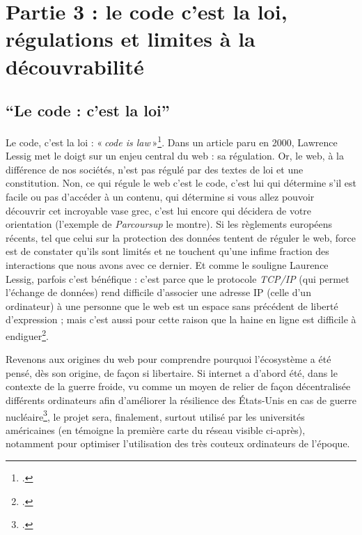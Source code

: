 

\part{Partie 3 : le code c'est la loi, régulations et limites à la découvrabilité}

\chapter*{\enquote{Le code : c'est la loi}}

Le code, c’est la loi : « \textit{code is law} »\footcite[(nous avons consulté la version française disponible sur Framablog)]{lessig_code_2000}. Dans un article paru en 2000, Lawrence Lessig met le doigt sur un enjeu central du web : sa régulation. Or, le web, à la différence de nos sociétés, n’est pas régulé par des textes de loi et une constitution. Non, ce qui régule le web c’est le code, c’est lui qui détermine s’il est facile ou pas d’accéder à un contenu, qui détermine si vous allez pouvoir découvrir cet incroyable vase grec, c’est lui encore qui décidera de votre orientation (l’exemple de \textit{Parcoursup} le montre). Si les règlements européens récents, tel que celui sur la protection des données tentent de réguler le web, force est de constater qu’ils sont limités et ne touchent qu’une infime fraction des interactions que nous avons avec ce dernier. Et comme le souligne Laurence Lessig, parfois c’est bénéfique : c’est parce que le protocole \textit{TCP/IP} (qui permet l’échange de données) rend difficile d’associer une adresse IP (celle d’un ordinateur) à une personne que le web est un espace sans précédent de liberté d’expression ; mais c’est aussi pour cette raison que la haine en ligne est difficile à endiguer\footcite[§8 et § 9]{lessig_code_2000}.

Revenons aux origines du web pour comprendre pourquoi l’écosystème a été pensé, dès son origine, de façon si libertaire. Si internet a d’abord été, dans le contexte de la guerre froide, vu comme un moyen de relier de façon décentralisée différents ordinateurs afin d’améliorer la résilience des États-Unis en cas de guerre nucléaire\footcite{2024i}, le projet sera, finalement, surtout utilisé par les universités américaines (en témoigne la première carte du réseau visible ci-après), notamment pour optimiser l’utilisation des très couteux ordinateurs de l’époque.


